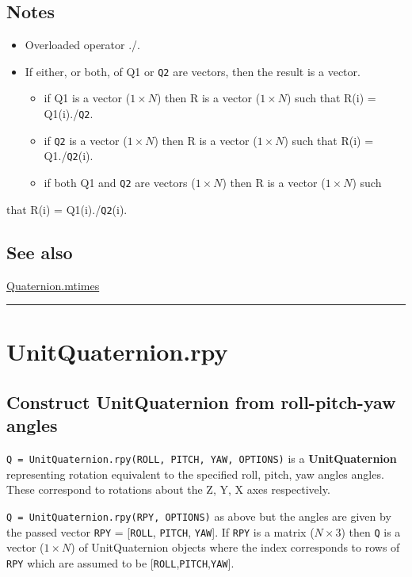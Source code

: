 \subsection*{Notes}
\begin{itemize}
  \item Overloaded operator \textquotesingle ./\textquotesingle .
  \item If either, or both, of Q1 or \texttt{Q2} are vectors, then the result is a vector.
\begin{itemize}
  \item if Q1 is a vector ($1 \times N$) then R is a vector ($1 \times N$) such that R(i) = Q1(i)./\texttt{Q2}.
  \item if \texttt{Q2} is a vector ($1 \times N$) then R is a vector ($1 \times N$) such that R(i) = Q1./\texttt{Q2}(i).
  \item if both Q1 and \texttt{Q2} are vectors ($1 \times N$) then R is a vector ($1 \times N$) such
\end{itemize}
\end{itemize}


that R(i) = Q1(i)./\texttt{Q2}(i).


\subsection*{See also}


\hyperlink{Quaternion.mtimes}{\color{blue} Quaternion.mtimes}

\vspace{1.5ex}\hrule

\hypertarget{UnitQuaternion.rpy}{\section*{UnitQuaternion.rpy}}
\subsection*{Construct UnitQuaternion from roll-pitch-yaw angles}


\texttt{Q = UnitQuaternion.rpy(ROLL, PITCH, YAW, OPTIONS)} is a \textbf{\color{red} UnitQuaternion}
representing rotation equivalent to the specified roll, pitch, yaw angles
angles. These correspond to rotations about the Z, Y, X axes
respectively.



\texttt{Q = UnitQuaternion.rpy(RPY, OPTIONS)} as above but the angles are given by
the passed vector \texttt{RPY} = [\texttt{ROLL}, \texttt{PITCH}, \texttt{YAW}].  If \texttt{RPY} is a matrix ($N \times 3$)
then \texttt{Q} is a vector ($1 \times N$) of UnitQuaternion objects where the index
corresponds to rows of \texttt{RPY} which are assumed to be [\texttt{ROLL},\texttt{PITCH},\texttt{YAW}].


